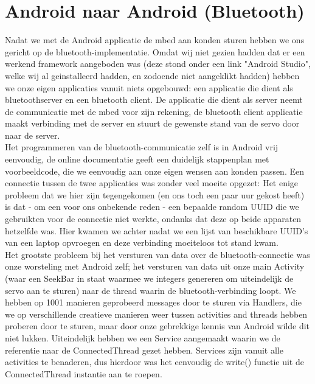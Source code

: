 \documentclass[pdftex,12pt,a4paper]{article}
\begin{document}
\section{Android naar Android (Bluetooth)}
Nadat we met de Android applicatie de mbed aan konden sturen hebben we ons
gericht op de bluetooth-implementatie. Omdat wij niet gezien hadden dat er een
werkend framework aangeboden was (deze stond onder een link "Android Studio",
welke wij al geinstalleerd hadden, en zodoende niet aangeklikt hadden) hebben we
onze eigen applicaties vanuit niets opgebouwd: een applicatie die dient als
bluetoothserver en een bluetooth client. De applicatie die dient als
server neemt de communicatie met de mbed voor zijn rekening, de bluetooth client
applicatie maakt verbinding met de server en stuurt de gewenste stand van de
servo door naar de server.\\
Het programmeren van de bluetooth-communicatie zelf is in Android vrij eenvoudig,
de online documentatie geeft een duidelijk stappenplan met voorbeeldcode, die we
eenvoudig aan onze eigen wensen aan konden passen. Een connectie tussen de twee
applicaties was zonder veel moeite opgezet: Het enige probleem dat we hier zijn
tegengekomen (en ons toch een paar uur gekost heeft) is dat - om een voor ons
onbekende reden - een bepaalde random UUID die we gebruikten voor de connectie
niet werkte, ondanks dat deze op beide apparaten hetzelfde was. Hier kwamen we
achter nadat we een lijst van beschikbare UUID's van een laptop opvroegen en
deze verbinding moeiteloos tot stand kwam.\\
Het grootste probleem bij het versturen van data over de bluetooth-connectie was
onze worsteling met Android zelf; het versturen van data uit onze main Activity
(waar een SeekBar in staat waarmee we integers genereren om uiteindelijk de
servo aan te sturen) naar de thread waarin de bluetooth-verbinding loopt. We
hebben op 1001 manieren geprobeerd messages door te sturen via Handlers, die we
op verschillende creatieve manieren weer tussen activities and threads hebben
proberen door te sturen, maar door onze gebrekkige kennis van Android wilde dit
niet lukken. Uiteindelijk hebben we een Service aangemaakt waarin we de
referentie naar de ConnectedThread gezet hebben. Services zijn vanuit alle 
activities te benaderen, dus hierdoor was het eenvoudig de write() functie uit
de ConnectedThread instantie aan te roepen.\\
\end{document}

